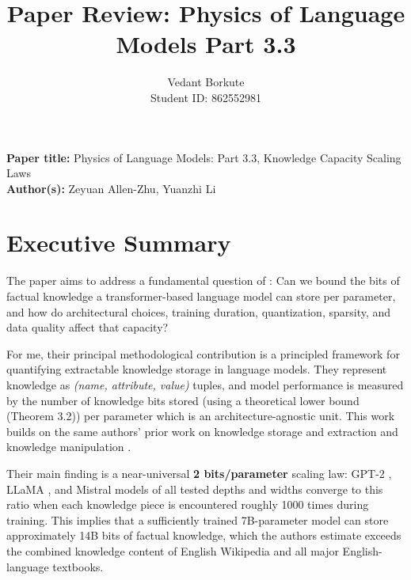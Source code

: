 \documentclass{article}
\title{Paper Review: Physics of Language Models Part 3.3}
\author{
  Vedant Borkute \\
  Student ID: 862552981
}
\begin{document}
\maketitle

\textbf{Paper title:} Physics of Language Models: Part 3.3, Knowledge Capacity Scaling Laws \\
\textbf{Author(s):} Zeyuan Allen-Zhu, Yuanzhi Li \cite{allenzhu2024part33} \\

\section{Executive Summary}

The paper \cite{allenzhu2024part33} aims to address a fundamental question of : Can we bound the bits of factual knowledge a transformer-based language model can store per parameter, and how do architectural choices, training duration, quantization, sparsity, and data quality affect that capacity?

For me, their principal methodological contribution is a principled framework for quantifying extractable knowledge storage in language models. They represent knowledge as \textit{(name, attribute, value)} tuples, and model performance is measured 
by the number of knowledge bits stored (using a theoretical lower bound (Theorem 3.2)) per parameter which is an architecture-agnostic unit. This work builds on the same authors' prior work on knowledge storage and extraction \cite{allenzhu2023part31} and knowledge manipulation \cite{allenzhu2023part32}.

Their main finding is a near-universal \textbf{2 bits/parameter} scaling law: GPT-2 \cite{radford2019gpt2}, LLaMA \cite{touvron2023llama}, and Mistral \cite{jiang2023mistral} models of all tested depths and widths converge to this ratio when each knowledge piece is encountered roughly 1000 times during training. This implies that a sufficiently trained 7B-parameter model can store approximately 14B bits of factual knowledge, which the authors estimate exceeds the combined knowledge content of English Wikipedia and all major English-language textbooks.
\end{document}
